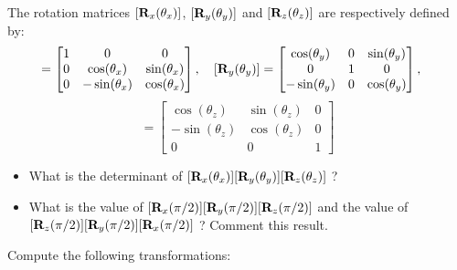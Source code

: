 \bexo
The rotation matrices $[\textbf{R}_x(\theta_x)]$, $[\textbf{R}_y(\theta_y)]$ and $[\textbf{R}_z(\theta_z)]$
are respectively defined by:
\begin{equation}
	[\tb{R}_x(\theta_x)]=\begin{bmatrix}
		1&0&0\\
		0 & \cos(\theta_x) &\sin(\theta_x)\\
		0 & -\sin(\theta_x) &\cos(\theta_x) 
	\end{bmatrix}\esp 
	[\tb{R}_y(\theta_y)]=\begin{bmatrix}
	\cos(\theta_y) &0&\sin(\theta_y)\\
0&1&0\\
-\sin(\theta_y)&0&\cos(\theta_y) 
	\end{bmatrix}
	\esp 
\end{equation}
\begin{equation}
[\tb{R}_z(\theta_z)]=\begin{bmatrix}
		\cos(\theta_z) &\sin(\theta_z)&0\\
		-\sin(\theta_z) &\cos(\theta_z)& 0\\
		0&0&1 
	\end{bmatrix}
\end{equation}

\begin{itemize}
	\item What is the determinant of $[\textbf{R}_x(\theta_x)][\textbf{R}_y(\theta_y)][\textbf{R}_z(\theta_z)]$ ?
	\item What is the value of $[\textbf{R}_x(\pi/2)][\textbf{R}_y(\pi/2)][\textbf{R}_z(\pi/2)]$ and the value of $[\textbf{R}_z(\pi/2)][\textbf{R}_y(\pi/2)][\textbf{R}_x(\pi/2)]$ ? Comment this result.
\end{itemize}


Compute the following transformations:
 




\eexo 

\solution{}
	




